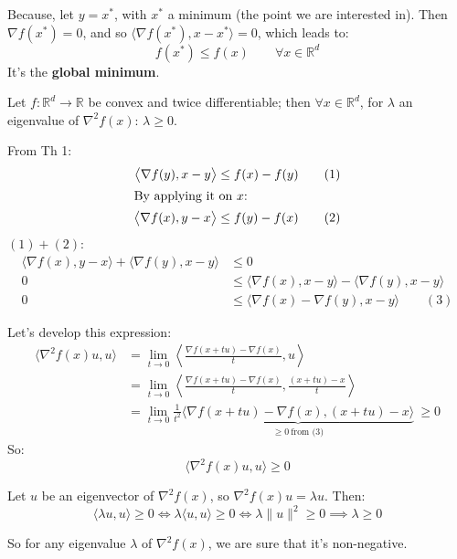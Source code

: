 Because, let $y=x^*$, with $x^*$ a minimum (the point we are interested in). Then $\nabla f(x^*)=0$, and so $\bigl\langle\nabla f(x^*),x-x^*\bigr\rangle=0$, which leads to:
\[
f(x^*)\le f(x)\qquad\forall x\in\mathbb{R}^d
\]
It's the \textbf{global minimum}.

Let $f:\mathbb{R}^d\to\mathbb{R}$ be convex and twice differentiable; then $\forall x\in\mathbb{R}^d$, for $\lambda$ an eigenvalue of $\nabla^2 f(x)$: $\lambda\ge0$.

\Demo
From Th 1:
\begin{align*}
\bigl\langle\nabla f(y),x-y\bigr\rangle&\le f(x)-f(y)\qquad(1)\\
\intertext{By applying it on $x$:}
\bigl\langle\nabla f(x),y-x\bigr\rangle&\le f(y)-f(x)\qquad(2)
\end{align*}
$(1)+(2)$:
\begin{align*}
\bigl\langle\nabla f(x),y-x\bigr\rangle+\bigl\langle\nabla f(y),x-y\bigr\rangle&\le 0\\
0&\le\bigl\langle\nabla f(x),x-y\bigr\rangle-\bigl\langle\nabla f(y),x-y\bigr\rangle\\
0&\le\bigl\langle\nabla f(x)-\nabla f(y),x-y\bigr\rangle\qquad(3)
\end{align*}

Let's develop this expression:
\begin{align*}
\bigl\langle\nabla^2 f(x)u,u\bigr\rangle&=\lim_{t\to0}\left\langle\frac{\nabla f(x+tu)-\nabla f(x)}{t},u\right\rangle\\
&=\lim_{t\to0}\left\langle\frac{\nabla f(x+tu)-\nabla f(x)}{t},\frac{(x+tu)-x}{t}\right\rangle\\
&=\lim_{t\to0}\frac{1}{t^2}\underbrace{\bigl\langle\nabla f(x+tu)-\nabla f(x),(x+tu)-x\bigr\rangle}_{\ge0\ \text{from (3)}}\ \ge0
\end{align*}
So:
\[
\boxed{\bigl\langle\nabla^2 f(x)u,u\bigr\rangle\ge0}
\]

Let $u$ be an eigenvector of $\nabla^2 f(x)$, so $\nabla^2 f(x)u=\lambda u$. Then:
\[
\langle\lambda u,u\rangle\ge0\iff\lambda\langle u,u\rangle\ge0\iff\lambda\lVert u\rVert^2\ge0\implies\boxed{\lambda\ge0}
\]

So for any eigenvalue $\lambda$ of $\nabla^2 f(x)$, we are sure that it's non-negative.\qedmark

